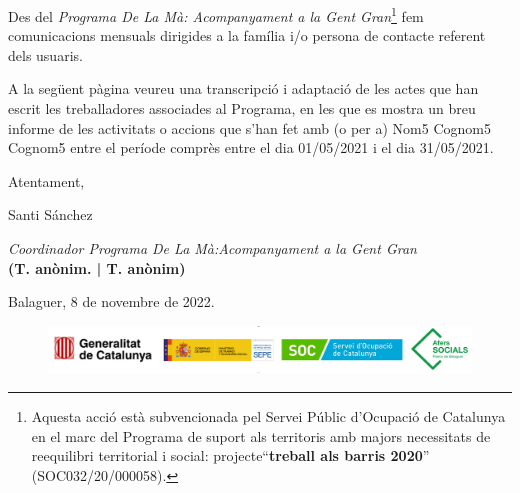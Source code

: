 \documentclass[a4paper,12pt]{elsarticle}  %
\begin{document}
Des del \textit{Programa De La Mà: Acompanyament a la Gent Gran}\footnote{Aquesta acció està subvencionada pel Servei Públic 
d'Ocupació de Catalunya en el marc del Programa de suport als territoris amb majors 
necessitats de reequilibri territorial i social: projecte``\textbf{treball als barris 2020}'' (SOC032/20/000058).} fem comunicacions mensuals
dirigides a la família i/o persona de contacte referent dels usuaris.


A la següent pàgina veureu una transcripció i adaptació de les actes que han escrit les treballadores associades
al Programa, en les que es mostra un breu informe de les activitats o accions que s'han fet amb (o per a) 
Nom5 Cognom5 Cognom5 entre el període comprès entre el dia 01/05/2021 i el dia 31/05/2021.

	\vspace{0.5cm}

\noindent Atentament,

\noindent Santi Sánchez

\noindent \textit{Coordinador Programa De La Mà:Acompanyament a la Gent Gran}\\
\textbf{(T. anònim. | T. anònim)}

	\vspace{0.5cm}

\noindent Balaguer, 8 de novembre de 2022.

	









\vfill

\FloatBarrier
\begin{figure}[h]
	\centering	
	\includegraphics[width=1\textwidth]{../IMATGES/logosGeneMinisterAferssocialsSoc.png}	
\end{figure}
\FloatBarrier	










\clearpage
\end{document}
